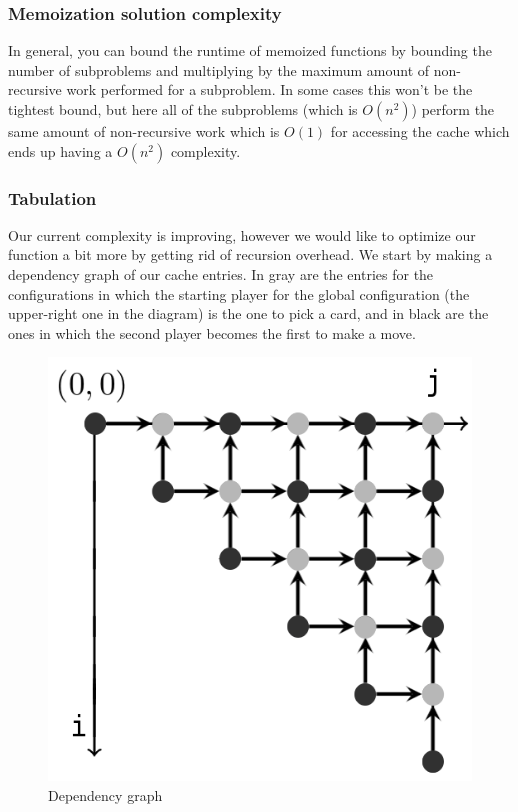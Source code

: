 \documentclass[a4paper,12pt,fleqn]{article}
\begin{document}
\subsubsection{Memoization solution complexity}

In general, you can bound the runtime of memoized functions by bounding the number of subproblems and multiplying by the maximum amount of non-recursive work performed for a subproblem. In some cases this won’t be the tightest bound, but here all of the subproblems (which is $O(n^2)$) perform the same amount of non-recursive work which is $O(1)$ for accessing the cache which ends up having a $O(n^2)$ complexity.

\subsubsection{Tabulation}

Our current complexity is improving, however we would like to optimize our function a bit more by getting rid of recursion overhead.
We start by making a dependency graph of our cache entries. In gray are the entries for the configurations in which the starting player for the global configuration (the upper-right one in the diagram) is the one to pick a card, and in black are the ones in which the second player becomes the first to make a move.

\begin{figure}[H]
    \centering
    \includegraphics[scale=0.5]{tabulation_01.png}

    \caption{Dependency graph}
    \label{fig:tabulation_01}
\end{figure}
\end{document}
